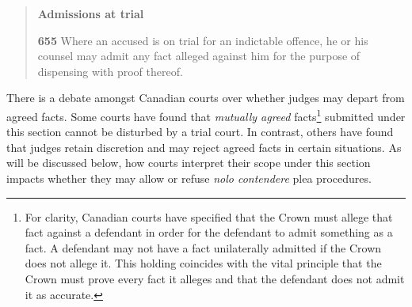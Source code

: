 \begin{quote}
    \singlespacing
    \textbf{Admissions at trial}
    
    \textbf{655} Where an accused is on trial for an indictable offence, he or his counsel may admit any fact alleged against him for the purpose of dispensing with proof thereof.
\end{quote}

There is a debate amongst Canadian courts over whether judges may depart from agreed facts. Some courts have found that \textit{mutually agreed} facts\footnote{For clarity, Canadian courts have specified that the Crown must allege that fact against a defendant in order for the defendant to admit something as a fact. A defendant may not have a fact unilaterally admitted if the Crown does not allege it. This holding coincides with the vital principle that the Crown must prove every fact it alleges and that the defendant does not admit it as accurate.} submitted under this section cannot be disturbed by a trial court. In contrast, others have found that judges retain discretion and may reject agreed facts in certain situations. As will be discussed below, how courts interpret their scope under this section impacts whether they may allow or refuse \textit{nolo contendere} plea procedures.